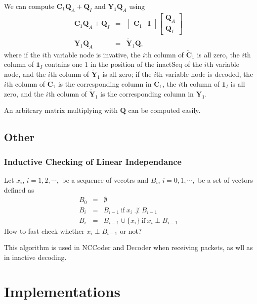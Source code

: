 \documentclass{report}
\begin{document}
We can compute $\mathbf{C}_1 \mathbf{Q}_A+\mathbf{Q}_I$ and
$\mathbf{Y}_1\mathbf{Q}_A$ using
\begin{eqnarray*}
  \mathbf{C}_1 \mathbf{Q}_A + \mathbf{Q}_I & = &  
  \begin{bmatrix}
    \mathbf{C}_1 & \mathbf{I}
  \end{bmatrix}
  \begin{bmatrix}
    \mathbf{Q}_A \\ \mathbf{Q}_I
  \end{bmatrix}  \\
  \mathbf{Y}_1\mathbf{Q}_A & = & \tilde{\mathbf{Y}}_1\mathbf{Q},
\end{eqnarray*}
where if the $i$th variable node is invative, the $i$th column of
$\tilde{\mathbf{C}}_1$ is all zero, the $i$th column of $\mathbf{1}_I$
contains one $1$ in the position of the inactSeq of the $i$th variable
node, and the $i$th column of $\tilde{\mathbf{Y}}_1$ is all zero; if
the $i$th variable node is decoded, the $i$th column of
$\tilde{\mathbf{C}}_1$ is the corresponding column in $\mathbf{C}_1$,
the $i$th column of $\mathbf{1}_I$ is all zero, and the $i$th column
of $\tilde{\mathbf{Y}}_1$ is the corresponding column in
$\mathbf{Y}_1$.

An arbitrary matrix multiplying with $\mathbf{Q}$ can be computed easily.

\section{Other}

\subsection{Inductive Checking of Linear Independance}

Let $x_i$, $i=1,2,\cdots,$ be a sequence of vecotrs and $B_i$,
$i=0,1,\cdots,$ be a set of vectors defined as
\begin{eqnarray*}
  B_0 & = & \emptyset \\
  B_i & = & B_{i-1}\ \text{if}\ x_i\not\perp B_{i-1} \\
  B_i & = & B_{i-1}\cup\{x_i\}\ \text{if}\ x_i\perp B_{i-1}
\end{eqnarray*}
How to fast check whether $ x_i\perp B_{i-1}$ or not?

This algorithm is used in NCCoder and Decoder when receiving packets,
as wll as in inactive decoding.

\chapter{Implementations}
\end{document}
